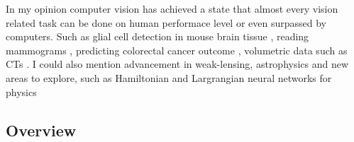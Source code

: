\documentclass[a4paper,12pt]{article}
\begin{document}
\vspace{4mm}

\par In my opinion computer vision has achieved a state that almost every vision related task can be done on human performace level or even surpassed by computers. Such as glial cell detection in mouse brain tissue \cite{suleymanova2018deep}, reading mammograms  \cite{ribli2018detecting}, 
predicting colorectal cancer outcome \cite{skrede2020deep}, volumetric data such as CTs \cite{cciccek20163d}. I could also mention advancement in weak-lensing, astrophysics \cite{ribli2019improved} and new areas to explore, such as Hamiltonian \cite{greydanus2019hamiltonian} and Largrangian \cite{} neural networks for physics

\subsection{Overview}

\newpage



\end{document}
